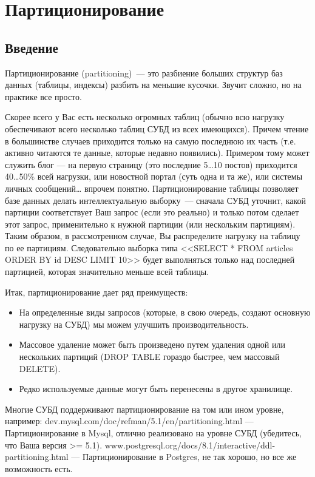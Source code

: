 \chapter{Партиционирование}
\begin{epigraphs}
\end{epigraphs}
\section{Введение}
Партиционирование (partitioning)~--- это разбиение больших структур баз данных (таблицы, индексы) разбить на меньшие кусочки. 
Звучит сложно, но на практике все просто.

Скорее всего у Вас есть несколько огромных таблиц (обычно всю нагрузку обеспечивают всего несколько таблиц СУБД из всех имеющихся). 
Причем чтение в большинстве случаев приходится только на самую последнюю их часть (т.е. активно читаются те данные, которые 
недавно появились). Примером тому может служить блог — на первую страницу (это последние 5\dots10 постов) приходится 40\dots50\% 
всей нагрузки, или новостной портал (суть одна и та же), или системы личных сообщений… впрочем понятно. Партиционирование 
таблицы позволяет базе данных делать интеллектуальную выборку~--- сначала СУБД уточнит, какой партиции соответствует Ваш запрос 
(если это реально) и только потом сделает этот запрос, применительно к нужной партиции (или нескольким партициям). Таким образом, 
в рассмотренном случае, Вы распределите нагрузку на таблицу по ее партициям. Следовательно выборка типа 
<<SELECT * FROM articles ORDER BY id DESC LIMIT 10>> будет выполняться только над последней партицией, которая значительно 
меньше всей таблицы.

Итак, партиционирование дает ряд преимуществ:
\begin{itemize}
\item На определенные виды запросов (которые, в свою очередь, создают основную нагрузку на СУБД) мы можем улучшить производительность.
\item Массовое удаление может быть произведено путем удаления одной или нескольких партиций 
(DROP TABLE гораздо быстрее, чем массовый DELETE).
\item Редко используемые данные могут быть перенесены в другое хранилище.
\end{itemize}

Многие СУБД поддерживают партиционирование на том или ином уровне, например:
dev.mysql.com/doc/refman/5.1/en/partitioning.html — Партиционирование в Mysql, 
отлично реализовано на уровне СУБД (убедитесь, что Ваша версия >= 5.1).
www.postgresql.org/docs/8.1/interactive/ddl-partitioning.html — Партиционирование в Postgres, 
не так хорошо, но все же возможность есть.